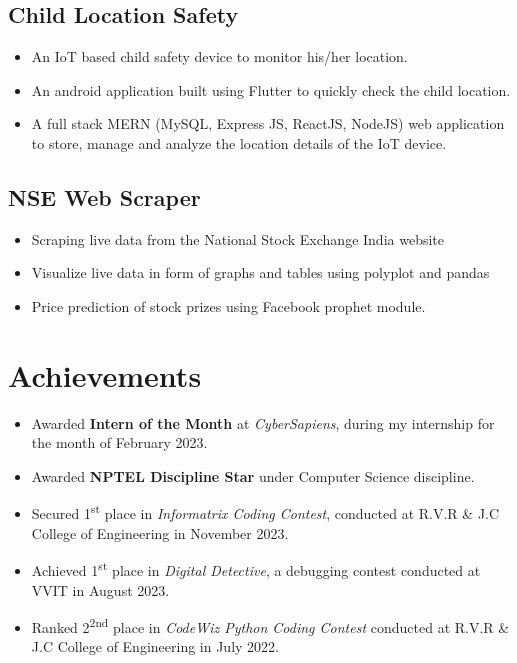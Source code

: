 \documentclass[]{roshan-resume}
\begin{document}
\begin{minipage}[t]{0.66\textwidth}
		\subsection{Child Location Safety}
		\begin{itemize}
			\item An IoT based child safety device to monitor his/her location.
			\item An android application built using Flutter to quickly check the child location.
			\item A full stack MERN (MySQL, Express JS, ReactJS, NodeJS) web application to store, manage and analyze the location details of the IoT device.
		\end{itemize}
		
		\subsection{NSE Web Scraper}
		\begin{itemize}
			\item Scraping live data from the National Stock Exchange India website
			\item Visualize live data in form of graphs and tables using polyplot and pandas
			\item Price prediction of stock prizes using Facebook prophet module.
		\end{itemize}
		
		
		
		
		\section{Achievements} 
		\begin{itemize}
			\item Awarded \textbf{Intern of the Month} at \textit{CyberSapiens}, during my internship for the month of February 2023.
			\item Awarded \textbf{NPTEL Discipline Star} under Computer Science discipline.
			\item Secured 1\textsuperscript{st} place in \textit{Informatrix Coding Contest}, conducted at R.V.R \& J.C College of Engineering in November 2023.
			\item Achieved 1\textsuperscript{st} place in \textit{Digital Detective}, a debugging contest conducted at VVIT in August 2023.
			\item Ranked 2\textsuperscript{2nd} place in \textit{CodeWiz Python Coding Contest} conducted at R.V.R \& J.C College of Engineering in July 2022.
		\end{itemize}
		

\end{minipage}
\end{document}

